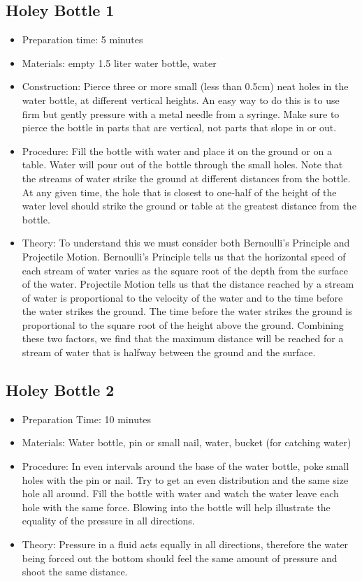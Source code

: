 \subsection{Holey Bottle 1}
\begin{itemize}
\item{Preparation time: 5 minutes}
\item{Materials: empty 1.5 liter water bottle, water}
\item{Construction: Pierce three or more small (less than 0.5cm) neat holes in the water bottle, at different vertical heights. An easy way to do this is to use firm but gently pressure with a metal needle from a syringe. Make sure to pierce the bottle in parts that are vertical, not parts that slope in or out.}
\item{Procedure: Fill the bottle with water and place it on the ground or on a table. Water will pour out of the bottle through the small holes. Note that the streams of water strike the ground at different distances from the bottle. At any given time, the hole that is closest to one-half of the height of the water level should strike the ground or table at the greatest distance from the bottle.}
\item{Theory: To understand this we must consider both Bernoulli’s Principle and Projectile Motion. Bernoulli’s Principle tells us that the horizontal speed of each stream of water varies as the square root of the depth from the surface of the water. Projectile Motion tells us that the distance reached by a stream of water is proportional to the velocity of the water and to the time before the water strikes the ground. The time before the water strikes the ground is proportional to the square root of the height above the ground. Combining these two factors, we find that the maximum distance will be reached for a stream of water that is halfway between the ground and the surface.}
\end{itemize}

\subsection{Holey Bottle 2}
\begin{itemize}
\item{Preparation Time: 10 minutes}
\item{Materials: Water bottle, pin or small nail, water, bucket (for catching water)}
\item{Procedure: In even intervals around the base of the water bottle, poke small holes with the pin or nail. Try to get an even distribution and the same size hole all around. Fill the bottle with water and watch the water leave each hole with the same force. Blowing into the bottle will help illustrate the equality of the pressure in all directions.}
\item{Theory: Pressure in a fluid acts equally in all directions, therefore the water being forced out the bottom should feel the same amount of pressure and shoot the same distance.}
\end{itemize}

